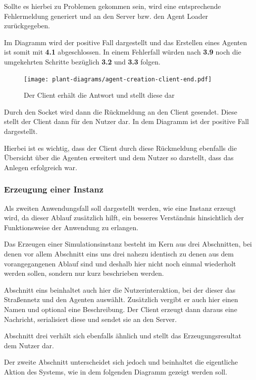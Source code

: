 Sollte es hierbei zu Problemen gekommen sein, wird eine entsprechende Fehlermeldung generiert und an den Server bzw.
den Agent Loader zurückgegeben.

Im Diagramm wird der positive Fall dargestellt und das Erstellen eines Agenten ist somit mit \textbf{4.1} abgeschlossen.
In einem Fehlerfall würden nach \textbf{3.9} noch die umgekehrten Schritte bezüglich \textbf{3.2} und \textbf{3.3} folgen.

\begin{figure}[htb]
    \centering
    \texttt{[image: plant-diagrams/agent-creation-client-end.pdf]}
    \caption{Der Client erhält die Antwort und stellt diese dar}
    \ownsource
    \label{fig:agent-creation-client-end}
\end{figure}

Durch den Socket wird dann die Rückmeldung an den Client gesendet.
Diese stellt der Client dann für den Nutzer dar.
In dem Diagramm  ist der positive Fall dargestellt.

Hierbei ist es wichtig, dass der Client durch diese Rückmeldung ebenfalls die Übersicht über die Agenten erweitert und dem Nutzer so darstellt, dass das Anlegen erfolgreich war.

\subsubsection{Erzeugung einer Instanz}

Als zweiten Anwendungsfall soll dargestellt werden, wie eine Instanz erzeugt wird, da dieser Ablauf zusätzlich hilft, ein besseres Verständnis hinsichtlich der Funktionsweise der Anwendung zu erlangen.

Das Erzeugen einer Simulationsinstanz besteht im Kern aus drei Abschnitten, bei denen vor allem Abschnitt eins uns drei nahezu identisch zu denen aus dem vorangegangenen Ablauf sind und deshalb hier nicht noch einmal wiederholt werden sollen, sondern nur kurz beschrieben werden.

Abschnitt eins beinhaltet auch hier die Nutzerinteraktion, bei der dieser das Straßennetz und den Agenten auswählt.
Zusätzlich vergibt er auch hier einen Namen und optional eine Beschreibung.
Der Client erzeugt dann daraus eine Nachricht, serialisiert diese und sendet sie an den Server.

Abschnitt drei verhält sich ebenfalls ähnlich und stellt das Erzeugungsresultat dem Nutzer dar.

Der zweite Abschnitt unterscheidet sich jedoch und beinhaltet die eigentliche Aktion des Systems, wie in dem folgenden Diagramm gezeigt werden soll.

